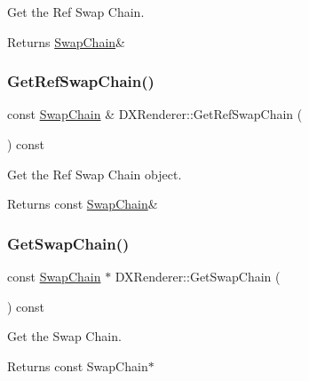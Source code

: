 Get the Ref Swap Chain. 

\begin{DoxyReturn}{Returns}
\hyperlink{structSwapChain}{Swap\+Chain}\& 
\end{DoxyReturn}
\mbox{\label{classDXRenderer_a28d203f9cd99268797fbd869f996e1a8}} 
\subsubsection{\texorpdfstring{Get\+Ref\+Swap\+Chain()}{GetRefSwapChain()}\hspace{0.1cm}{\footnotesize\ttfamily [2/2]}}
{\footnotesize\ttfamily const \hyperlink{structSwapChain}{Swap\+Chain} \& D\+X\+Renderer\+::\+Get\+Ref\+Swap\+Chain (\begin{DoxyParamCaption}{ }\end{DoxyParamCaption}) const}



Get the Ref Swap Chain object. 

\begin{DoxyReturn}{Returns}
const \hyperlink{structSwapChain}{Swap\+Chain}\& 
\end{DoxyReturn}
\mbox{\label{classDXRenderer_a17b919b6970a81fb3f1ddc62d368d0bb}} 
\subsubsection{\texorpdfstring{Get\+Swap\+Chain()}{GetSwapChain()}\hspace{0.1cm}{\footnotesize\ttfamily [1/2]}}
{\footnotesize\ttfamily const \hyperlink{structSwapChain}{Swap\+Chain} $\ast$ D\+X\+Renderer\+::\+Get\+Swap\+Chain (\begin{DoxyParamCaption}{ }\end{DoxyParamCaption}) const}



Get the Swap Chain. 

\begin{DoxyReturn}{Returns}
const Swap\+Chain$\ast$ 
\end{DoxyReturn}
\mbox{\label{classDXRenderer_a570a2b13bad1619410193226a2ae933b}} 
